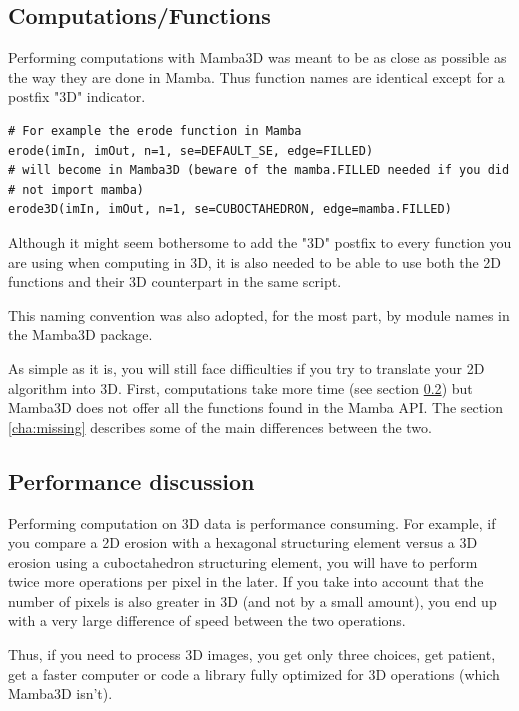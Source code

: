 \documentclass[a4paper,10pt,oneside]{article}
\begin{document}
\subsection{Computations/Functions}

Performing computations with Mamba3D was meant to be as close as possible
as the way they are done in Mamba. Thus function names are identical except
for a postfix "3D" indicator.

\lstset{language=Python}
\begin{lstlisting}
# For example the erode function in Mamba
erode(imIn, imOut, n=1, se=DEFAULT_SE, edge=FILLED)
# will become in Mamba3D (beware of the mamba.FILLED needed if you did 
# not import mamba)
erode3D(imIn, imOut, n=1, se=CUBOCTAHEDRON, edge=mamba.FILLED)
\end{lstlisting}

Although it might seem bothersome to add the "3D" postfix to every
function you are using when computing in 3D, it is also needed to be able to
use both the 2D functions and their 3D counterpart in the same script.

This naming convention was also adopted, for the most part, by module
names in the Mamba3D package.

As simple as it is, you will still face difficulties if you try to translate
your 2D algorithm into 3D. First, computations take more time (see section
\ref{cha:perfo}) but Mamba3D does not offer all the functions found in
the Mamba API. The section \ref{cha:missing} describes some of the 
main differences between the two.

\subsection{Performance discussion}
\label{cha:perfo}

Performing computation on 3D data is performance consuming. For example, if
you compare a 2D erosion with a hexagonal structuring element versus a 3D
erosion using a cuboctahedron structuring element, you will have to perform
twice more operations per pixel in the later. If you take into account that
the number of pixels is also greater in 3D (and not by a small amount), you end
up with a very large difference of speed between the two operations.

Thus, if you need to process 3D images, you get only three choices, get patient, 
get a faster computer or code a library fully optimized for 3D operations 
(which Mamba3D isn't).
\end{document}

